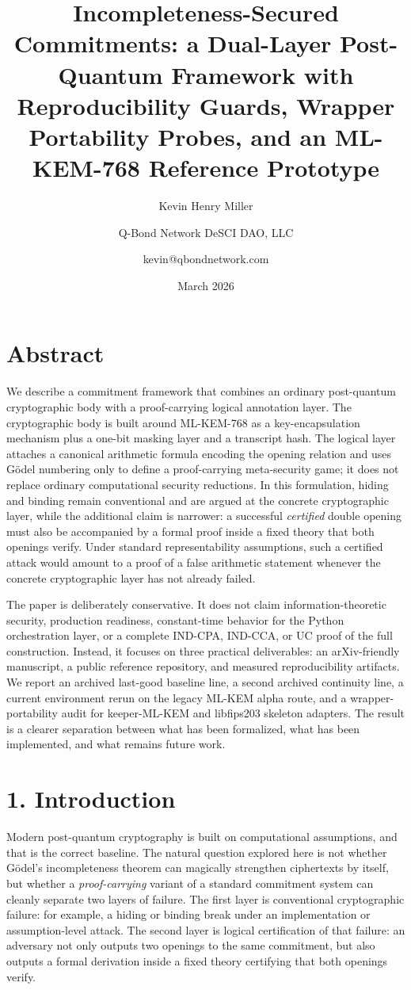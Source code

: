 \documentclass[
  11pt,
]{article}
\title{Incompleteness-Secured Commitments: a Dual-Layer Post-Quantum
Framework with Reproducibility Guards, Wrapper Portability Probes, and
an ML-KEM-768 Reference Prototype}
\author{Kevin Henry Miller \and Q-Bond Network DeSCI DAO,
LLC \and kevin@qbondnetwork.com}
\date{March 2026}
\begin{document}
\maketitle

\section{Abstract}\label{abstract}

We describe a commitment framework that combines an ordinary
post-quantum cryptographic body with a proof-carrying logical annotation
layer. The cryptographic body is built around ML-KEM-768 as a
key-encapsulation mechanism plus a one-bit masking layer and a
transcript hash. The logical layer attaches a canonical arithmetic
formula encoding the opening relation and uses Gödel numbering only to
define a proof-carrying meta-security game; it does not replace ordinary
computational security reductions. In this formulation, hiding and
binding remain conventional and are argued at the concrete cryptographic
layer, while the additional claim is narrower: a successful
\emph{certified} double opening must also be accompanied by a formal
proof inside a fixed theory that both openings verify. Under standard
representability assumptions, such a certified attack would amount to a
proof of a false arithmetic statement whenever the concrete
cryptographic layer has not already failed.

The paper is deliberately conservative. It does not claim
information-theoretic security, production readiness, constant-time
behavior for the Python orchestration layer, or a complete IND-CPA,
IND-CCA, or UC proof of the full construction. Instead, it focuses on
three practical deliverables: an arXiv-friendly manuscript, a public
reference repository, and measured reproducibility artifacts. We report
an archived last-good baseline line, a second archived continuity line,
a current environment rerun on the legacy ML-KEM alpha route, and a
wrapper-portability audit for keeper-ML-KEM and libfips203 skeleton
adapters. The result is a clearer separation between what has been
formalized, what has been implemented, and what remains future work.

\section{1. Introduction}\label{introduction}

Modern post-quantum cryptography is built on computational assumptions,
and that is the correct baseline. The natural question explored here is
not whether Gödel's incompleteness theorem can magically strengthen
ciphertexts by itself, but whether a \emph{proof-carrying} variant of a
standard commitment system can cleanly separate two layers of failure.
The first layer is conventional cryptographic failure: for example, a
hiding or binding break under an implementation or assumption-level
attack. The second layer is logical certification of that failure: an
adversary not only outputs two openings to the same commitment, but also
outputs a formal derivation inside a fixed theory certifying that both
openings verify.
\end{document}
